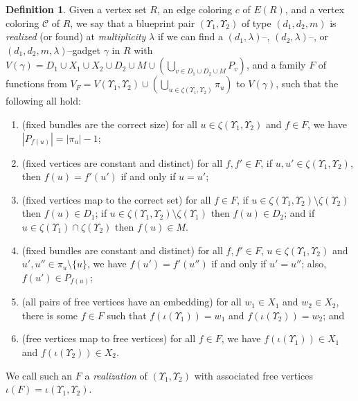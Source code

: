 \documentclass{article}
\newcommand{\cC}{\mathcal{C} }
\theoremstyle{definition}
\newtheorem{defn}[theorem]{Definition}
\begin{document}
\begin{defn}\label{def:realization}
    Given a vertex set $R$, an edge coloring $c$ of $E(R)$, and a vertex coloring $\cC$ of $R$, we say that a blueprint pair $(\Upsilon_1,\Upsilon_2)$ of type $(d_1,d_2,m)$ is \emph{realized} (or found) at \emph{multiplicity} $\lambda$ if we can find a $(d_1,\lambda)$--, $(d_2,\lambda)$--, or $(d_1,d_2,m,\lambda)$--gadget $\gamma$ in $R$ with $V(\gamma)=D_1\cup X_1 \cup X_2 \cup D_2 \cup M \cup \left(\bigcup_{v\in D_1\cup D_2\cup M} P_v\right)$, and a family $F$ of functions from $V_F=V(\Upsilon_1,\Upsilon_2)\cup \left(\bigcup_{u\in\zeta(\Upsilon_1,\Upsilon_2)}\pi_{u}\right)$ to $V(\gamma)$, such that the following all hold: 
    
    \begin{enumerate}
        \item (fixed bundles are the correct size) for all $u\in \zeta(\Upsilon_1,\Upsilon_2)$ and $f\in F$, we have $|P_{f(u)}|=|\pi_u|-1$;\label{Bundles_correct}
        \item (fixed vertices are constant and distinct) for all $f,f'\in F$, if $u,u'\in  \zeta(\Upsilon_1, \Upsilon_2)$, then $f(u)=f'(u')$ if and only if $u=u'$;
        \item (fixed vertices map to the correct set) for all $f\in F$, if $u\in \zeta(\Upsilon_1, \Upsilon_2)\setminus \zeta(\Upsilon_2)$ then $f(u)\in D_1$; if $u\in \zeta(\Upsilon_1, \Upsilon_2)\setminus \zeta(\Upsilon_1)$ then $f(u)\in D_2$; and if $u\in \zeta(\Upsilon_1)\cap \zeta(\Upsilon_2)$ then $f(u)\in M$.
        \item (fixed bundles are constant and distinct) for all $f,f'\in F$, $u\in \zeta(\Upsilon_1,\Upsilon_2)$ and $u',u''\in \pi_u\setminus \{u\}$, we have $f(u')=f'(u'')$ if and only if $u'=u''$; also, $f(u')\in P_{f(u)}$;
        \item (all pairs of free vertices have an embedding) for all $w_1\in X_1$ and $w_2\in X_2$, there is some $f\in F$ such that $f(\iota(\Upsilon_1))=w_1$ and $f(\iota(\Upsilon_2))=w_2$; and
        \item (free vertices map to free vertices) for all $f\in F$, we have $f(\iota(\Upsilon_1))\in X_1$ and $f(\iota(\Upsilon_2))\in X_2$.
    \end{enumerate}

    
     We call such an $F$ a \emph{realization} of $(\Upsilon_1, \Upsilon_2)$ with associated free vertices $\iota(F)=\iota(\Upsilon_1,\Upsilon_2)$.


\end{defn}
\end{document}

